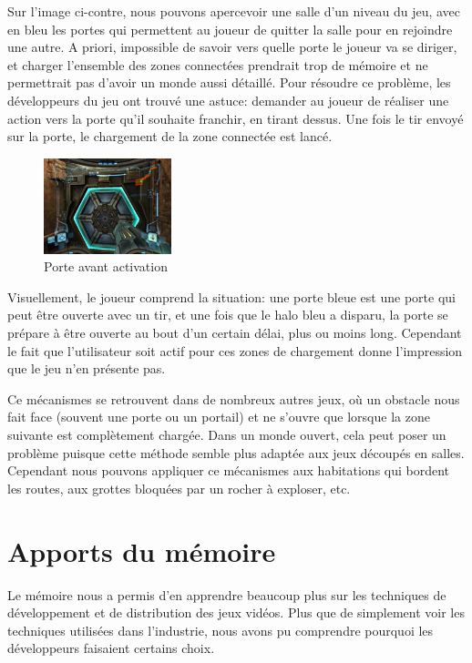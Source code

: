 \documentclass[a4paper, 12pt]{article} %
\begin{document}
Sur l'image ci-contre, nous pouvons apercevoir une salle d'un niveau du jeu, avec en bleu les portes qui permettent au joueur de quitter la salle pour en rejoindre une autre. A priori, impossible de savoir vers quelle porte le joueur va se diriger, et charger l'ensemble des zones connectées prendrait trop de mémoire et ne permettrait pas d'avoir un monde aussi détaillé. Pour résoudre ce problème, les développeurs du jeu ont trouvé une astuce: demander au joueur de réaliser une action vers la porte qu'il souhaite franchir, en tirant dessus. Une fois le tir envoyé sur la porte, le chargement de la zone connectée est lancé.

\begin{figure}
\begin{center}
\includegraphics[width=0.33\textwidth]{images/metroid-prime_door.png}
\end{center}
\caption{Porte avant activation}
\end{figure}
Visuellement, le joueur comprend la situation: une porte bleue est une porte qui peut être ouverte avec un tir, et une fois que le halo bleu a disparu, la porte se prépare à être ouverte au bout d'un certain délai, plus ou moins long. Cependant le fait que l'utilisateur soit actif pour ces zones de chargement donne l'impression que le jeu n'en présente pas.

Ce mécanismes se retrouvent dans de nombreux autres jeux, où un obstacle nous fait face (souvent une porte ou un portail) et ne s'ouvre que lorsque la zone suivante est complètement chargée.
Dans un monde ouvert, cela peut poser un problème puisque cette méthode semble plus adaptée aux jeux découpés en salles. Cependant nous pouvons appliquer ce mécanismes aux habitations qui bordent les routes, aux grottes bloquées par un rocher à exploser, etc.


\newpage
\section{Apports du mémoire}
Le mémoire nous a permis d'en apprendre beaucoup plus sur les techniques de développement et de distribution des jeux vidéos. Plus que de simplement voir les techniques utilisées dans l'industrie, nous avons pu comprendre pourquoi les développeurs faisaient certains choix.
\end{document}
